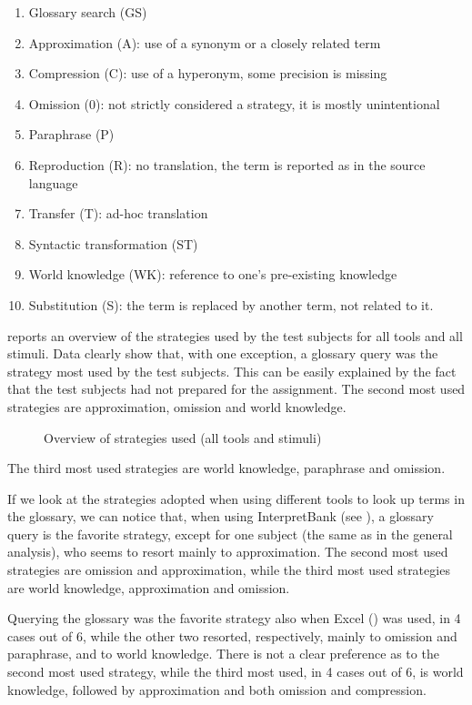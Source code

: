 \documentclass[output=paper]{langsci/langscibook}
\begin{document}
\begin{enumerate}
\item Glossary search (GS)
\item Approximation (A): use of a synonym or a closely related term
\item Compression (C): use of a hyperonym, some precision is missing
\item Omission (0): not strictly considered a strategy, it is mostly unintentional
\item Paraphrase (P)
\item Reproduction (R): no translation, the term is reported as in the source language
\item Transfer (T): ad-hoc translation
\item Syntactic transformation (ST)
\item World knowledge (WK): reference to one’s pre-existing knowledge
\item Substitution (S): the term is replaced by another term, not related to it.
\end{enumerate}


 reports an overview of the strategies used by the test subjects for all tools and all stimuli. Data clearly show that, with one exception, a glossary query was the strategy most used by the test subjects. This can be easily explained by the fact that the test subjects had not prepared for the assignment. The second most used strategies are approximation, omission and world knowledge.

\begin{figure}
\caption{Overview of strategies used (all tools and stimuli)}
\label{fig:prandi:15}
\end{figure}

The third most used strategies are world knowledge, paraphrase and omission.

If we look at the strategies adopted when using different tools to look up terms in the glossary, we can notice that, when using InterpretBank (see ), a glossary query is the favorite strategy, except for one subject (the same as in the general analysis), who seems to resort mainly to approximation. The second most used strategies are omission and approximation, while the third most used strategies are world knowledge, approximation and omission.

Querying the glossary was the favorite strategy also when Excel () was used, in 4 cases out of 6, while the other two resorted, respectively, mainly to omission and paraphrase, and to world knowledge. There is not a clear preference as to the second most used strategy, while the third most used, in 4 cases out of 6, is world knowledge, followed by approximation and both omission and compression.
\end{document}
